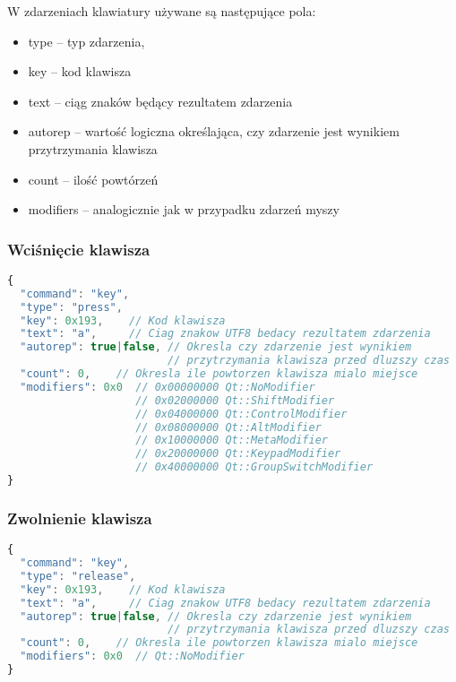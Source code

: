 W zdarzeniach klawiatury używane są następujące pola:
\begin{itemize}
\item type -- typ zdarzenia,
\item key -- kod klawisza
\item text -- ciąg znaków będący rezultatem zdarzenia
\item autorep -- wartość logiczna określająca, czy zdarzenie jest wynikiem przytrzymania klawisza
\item count -- ilość powtórzeń
\item modifiers -- analogicznie jak w przypadku zdarzeń myszy
\end{itemize}

\subsubsection{Wciśnięcie klawisza}
\begin{lstlisting}[language=JavaScript,numbers=none]
{
  "command": "key",
  "type": "press", 
  "key": 0x193,    // Kod klawisza
  "text": "a",     // Ciag znakow UTF8 bedacy rezultatem zdarzenia
  "autorep": true|false, // Okresla czy zdarzenie jest wynikiem
                         // przytrzymania klawisza przed dluzszy czas
  "count": 0,    // Okresla ile powtorzen klawisza mialo miejsce
  "modifiers": 0x0  // 0x00000000 Qt::NoModifier
                    // 0x02000000 Qt::ShiftModifier
                    // 0x04000000 Qt::ControlModifier
                    // 0x08000000 Qt::AltModifier
                    // 0x10000000 Qt::MetaModifier
                    // 0x20000000 Qt::KeypadModifier
                    // 0x40000000 Qt::GroupSwitchModifier
}
\end{lstlisting}

\subsubsection{Zwolnienie klawisza}
\begin{lstlisting}[language=JavaScript,numbers=none]
{
  "command": "key",
  "type": "release", 
  "key": 0x193,    // Kod klawisza
  "text": "a",     // Ciag znakow UTF8 bedacy rezultatem zdarzenia
  "autorep": true|false, // Okresla czy zdarzenie jest wynikiem
                         // przytrzymania klawisza przed dluzszy czas
  "count": 0,    // Okresla ile powtorzen klawisza mialo miejsce
  "modifiers": 0x0  // Qt::NoModifier
}
\end{lstlisting}
 